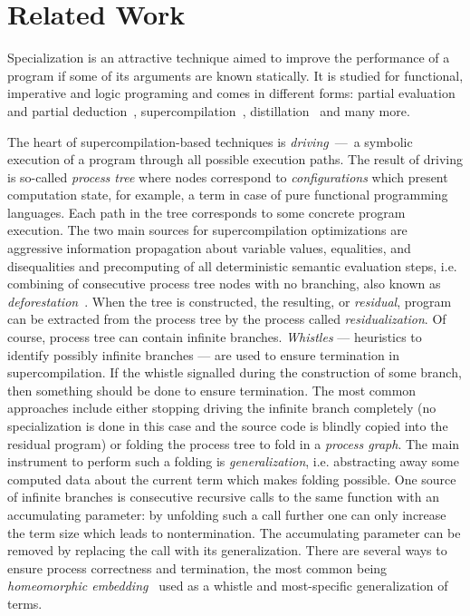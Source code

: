 \section{Related Work}

Specialization is an attractive technique aimed to improve the performance of a program if some of its arguments are known statically.
It is studied for functional, imperative and logic programing and comes in different forms: partial evaluation~\cite{jonesbook} and partial deduction~\cite{lloyd1991partial}, supercompilation~\cite{soerensen1996positive}, distillation~\cite{hamilton2007distillation} and many more.


The heart of supercompilation-based techniques is \emph{driving}~---~a symbolic execution of a program through all possible execution paths.
The result of driving is so-called \emph{process tree} where nodes correspond to \emph{configurations} which present computation state, for example, a term in case of pure functional programming languages.
Each path in the tree corresponds to some concrete program execution.
The two main sources for supercompilation optimizations are aggressive information propagation about variable values, equalities, and disequalities and precomputing of all deterministic semantic evaluation steps, i.e. combining of consecutive process tree nodes with no branching, also known as \emph{deforestation}~\cite{deforestation}.
When the tree is constructed, the resulting, or \emph{residual}, program can be extracted from the process tree by the process called \emph{residualization}.
Of course, process tree can contain infinite branches.
\emph{Whistles} --- heuristics to identify possibly infinite branches --- are used to ensure termination in supercompilation.
If the whistle signalled during the construction of some branch, then something should be done to ensure termination.
The most common approaches include either stopping driving the infinite branch completely (no specialization is done in this case and the source code is blindly copied into the residual program) or folding the process tree to fold in a \emph{process graph}.
The main instrument to perform such a folding is \emph{generalization}, i.e. abstracting away some computed data about the current term which makes folding possible.
One source of infinite branches is consecutive recursive calls to the same function with an accumulating parameter: by unfolding such a call further one can only increase the term size which leads to nontermination.
The accumulating parameter can be removed by replacing the call with its generalization.
There are several ways to ensure process correctness and termination, the most common being \emph{homeomorphic embedding}~\cite{Higman52,Kruskal60} used as a whistle and most-specific generalization of terms.

